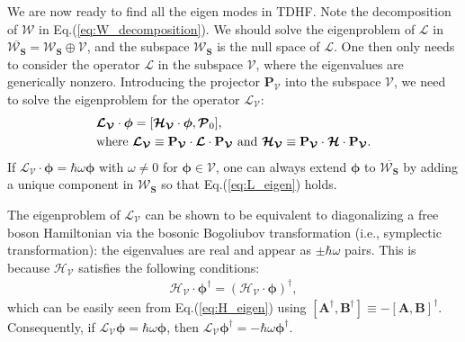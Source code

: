 \begin{subappendices}
    We are now ready to find all the eigen modes in TDHF. Note the decomposition of $\boldsymbol{\mathcal W}$ in Eq.(\ref{eq:W_decomposition}). We should solve the eigenproblem of $\boldsymbol{\mathcal L}$ in
    $\overline{\boldsymbol{\mathcal W}_{\mathbf S}}=\boldsymbol{\mathcal W}_{\mathbf S}\oplus \boldsymbol{\mathcal V}$, and the subspace $\boldsymbol{\mathcal W}_{\mathbf S}$ is the null space of $\boldsymbol{\mathcal L}$. One then only needs to consider the operator $\boldsymbol{\mathcal L}$ in the subspace $\boldsymbol{\mathcal V}$, where the eigenvalues are generically nonzero. Introducing the projector $\mathbf P_{\boldsymbol{\mathcal V}}$ into the subspace $\boldsymbol{\mathcal V}$, we need to solve the eigenproblem for the operator $\boldsymbol{\mathcal L}_{\boldsymbol{\mathcal V}}$:
    \begin{align}
         & \boldsymbol{\mathcal L}_{\boldsymbol{\mathcal V}}\cdot\boldsymbol{\phi}=[\boldsymbol{\mathcal H}_{\boldsymbol{\mathcal V}}\cdot\boldsymbol{\phi},\boldsymbol{\mathcal P}_0],\notag                                                                                                                                                                       \\
         & \text{where }\boldsymbol{\mathcal L}_{\boldsymbol{\mathcal V}}\equiv \mathbf P_{\boldsymbol{\mathcal V}}\cdot\boldsymbol{\mathcal L}\cdot\mathbf P_{\boldsymbol{\mathcal V}}\text{ and }\boldsymbol{\mathcal H}_{\boldsymbol{\mathcal V}}\equiv \mathbf P_{\boldsymbol{\mathcal V}}\cdot\boldsymbol{\mathcal H}\cdot\mathbf P_{\boldsymbol{\mathcal V}}.
    \end{align}
    If $\boldsymbol{\mathcal L}_{\boldsymbol{\mathcal V}}\cdot \boldsymbol\phi =\hbar\omega \boldsymbol\phi $ with $\omega\neq 0$ for $\boldsymbol\phi\in \boldsymbol{\mathcal V}$, one can always extend $\boldsymbol\phi$ to $\overline{\boldsymbol{\mathcal W}_{\mathbf S}}$ by adding a unique component in $\boldsymbol{\mathcal W}_{\mathbf S}$ so that Eq.(\ref{eq:L_eigen}) holds.

    The eigenproblem of $\boldsymbol{\mathcal L}_{\boldsymbol{\mathcal V}}$ can be shown to be equivalent to diagonalizing a free boson Hamiltonian via the bosonic Bogoliubov transformation (i.e., symplectic transformation): the eigenvalues are real and appear as $\pm \hbar\omega$ pairs. This is because $\boldsymbol{\mathcal H}_{\boldsymbol{\mathcal V}}$ satisfies the following conditions:
    \begin{align}
        \boldsymbol{\mathcal H}_{\boldsymbol{\mathcal V}}\cdot \boldsymbol{\phi}^\dagger=(\boldsymbol{\mathcal H}_{\boldsymbol{\mathcal V}}\cdot \boldsymbol{\phi})^\dagger,
    \end{align}
    which can be easily seen from Eq.(\ref{eq:H_eigen}) using $[\mathbf A^\dagger,\mathbf B^\dagger]\equiv-[\mathbf A,\mathbf B]^\dagger$. Consequently, if $\boldsymbol{\mathcal L}_{\boldsymbol{\mathcal V}}\boldsymbol{\phi}=\hbar\omega \boldsymbol{\phi}$, then $\boldsymbol{\mathcal L}_{\boldsymbol{\mathcal V}}\boldsymbol{\phi}^\dagger=-\hbar\omega \boldsymbol{\phi}^\dagger$.


\end{subappendices}
